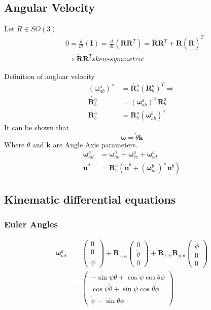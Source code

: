\subsection{Angular Velocity}

Let \(R\in SO(3)\)
\begin{align*}
    &0 = \frac{d}{dt}(\bm{I}) = \frac{d}{dt}(\bm{R}\bm{R}^T) = \dot{\bm{R}}\bm{R}^T + \bm{R}(\dot{\bm{R}})^T \\
    &\Rightarrow \dot{\bm{R}}\bm{R}^T \textit{skew-symmetric}
\end{align*}

Definition of angluar velocity
\begin{align*}
    (\bm{\omega}_{ab}^a)^\times &= \dot{\bm{R}_b^a}(\bm{R}_b^a)^T \Rightarrow \\
    \dot{\bm{R}_b^a} &= (\bm{\omega}_{ab}^a)^\times\bm{R}_b^a \\
    \dot{\bm{R}_b^a} &= \bm{R}_b^a(\bm{\omega}_{ab}^b)^\times
\end{align*}
It can be shown that
\[\bm{\omega} = \dot{\theta}\bm{k}\]
Where \(\theta\) and \(\bm{k}\) are Angle Axis parameters.
\begin{align*}
    \bm{\omega}_{ad}^a &= \bm{\omega}_{ab}^a + \bm{\omega}_{bc}^a + \bm{\omega}_{cd}^a \\
    \dot{\bm{u}}^a &= \bm{R}_b^a(\dot{\bm{u}}^b + (\bm{\omega}_{ab}^b)^\times\bm{u}^b)
\end{align*}

\subsection{Kinematic diﬀerential equations}
\setcounter{subsubsection}{3}
\subsubsection{Euler Angles}

\begin{align*}
    \bm{\omega}_{ad}^a &= \begin{pmatrix}0 \\ 0 \\ \dot{\psi}\end{pmatrix} + 
        \bm{R}_{z,\psi}\begin{pmatrix} 0 \\ \dot{\theta} \\ 0\end{pmatrix} +
            \bm{R}_{z,\psi}\bm{R}_{y,\theta}\begin{pmatrix}\dot{\phi} \\ 0 \\ 0\end{pmatrix} \\
                &= \begin{pmatrix}
                    -\sin\psi\dot{\theta}+\cos\psi\cos\theta\dot{\phi} \\
                    \cos\psi\dot{\theta}+\sin\psi\cos\theta\dot{\phi} \\
                    \dot{\psi}-\sin\theta\dot{\phi}
                \end{pmatrix}
\end{align*}
